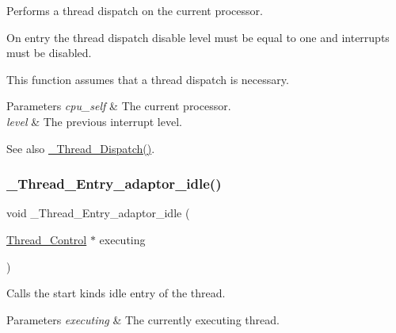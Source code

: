 Performs a thread dispatch on the current processor. 

On entry the thread dispatch disable level must be equal to one and interrupts must be disabled.

This function assumes that a thread dispatch is necessary.


\begin{DoxyParams}{Parameters}
{\em cpu\+\_\+self} & The current processor. \\
\hline
{\em level} & The previous interrupt level.\\
\hline
\end{DoxyParams}
\begin{DoxySeeAlso}{See also}
\mbox{\hyperlink{group__RTEMSScoreThread_ga14e949c0f400cda43b1e7547e50b088d}{\+\_\+\+Thread\+\_\+\+Dispatch()}}. 
\end{DoxySeeAlso}
\mbox{\label{group__RTEMSScoreThread_ga15433c1ca9df669c036739a50a8d1b9a}} 
\subsubsection{\texorpdfstring{\_Thread\_Entry\_adaptor\_idle()}{\_Thread\_Entry\_adaptor\_idle()}}
{\footnotesize\ttfamily void \+\_\+\+Thread\+\_\+\+Entry\+\_\+adaptor\+\_\+idle (\begin{DoxyParamCaption}\item[{\mbox{\hyperlink{struct__Thread__Control}{Thread\+\_\+\+Control}} $\ast$}]{executing }\end{DoxyParamCaption})}



Calls the start kinds idle entry of the thread. 


\begin{DoxyParams}{Parameters}
{\em executing} & The currently executing thread. \\
\hline
\end{DoxyParams}
\mbox{\label{group__RTEMSScoreThread_ga9223b77920482b86fba30d4113be119f}} 
